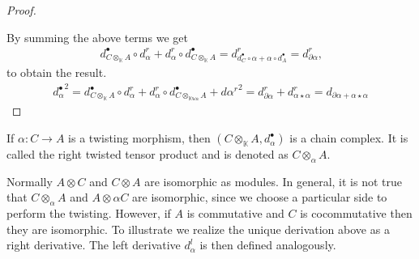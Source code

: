\documentclass[../thesis.tex]{subfiles}
\begin{document}
\begin{proof}
\begin{center}
\begin{tikzpicture}
                    \end{tikzpicture}
                \end{center}

                By summing the above terms we get 
                \begin{align*}
                    d_{C\otimes_\mathbb{K}A}^\bullet\circ d_\alpha^r + d_\alpha^r\circ d_{C\otimes_\mathbb{K} A}^\bullet = d_{d_C^\bullet\circ\alpha + \alpha\circ d_A^\bullet}^r = d_{\partial\alpha}^r\text{,}
                \end{align*}
                to obtain the result.
                \begin{align*}
                    {d_\alpha^\bullet}^2 = d_{C\otimes_\mathbb{K}A}^\bullet \circ d_\alpha^r + d_\alpha^r \circ d_{C\otimes_\mathbb{Kwe}A}^\bullet + {d\alpha^r}^2 = d_{\partial \alpha}^r + d_{\alpha\star\alpha}^r = d_{\partial \alpha + \alpha\star\alpha}
                \end{align*}
            \end{proof}

            \begin{corollary}
                If $\alpha:C\rightarrow A$ is a twisting morphism, then $(C\otimes_\mathbb{K}A, d_\alpha^\bullet)$ is a chain complex. It is called the right twisted tensor product and is denoted as $C\otimes_\alpha A$.
            \end{corollary}

            Normally $A\otimes C$ and $C\otimes A$ are isomorphic as modules. In general, it is not true that $C\otimes_\alpha A$ and $A\otimes\alpha C$ are isomorphic, since we choose a particular side to perform the twisting. However, if $A$ is commutative and $C$ is cocommutative then they are isomorphic. To illustrate we realize the unique derivation above as a right derivative. The left derivative $d_\alpha^l$ is then defined analogously.
            \begin{center}
            \end{center}
\end{document}
